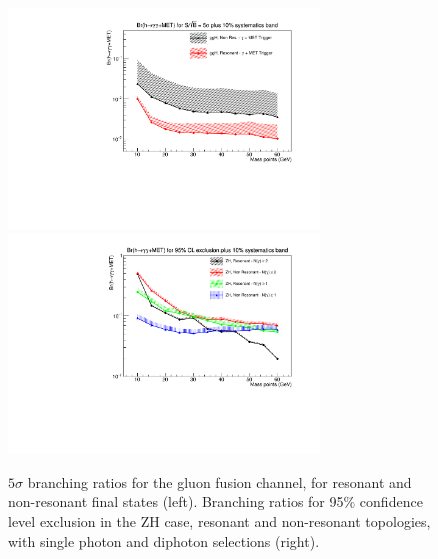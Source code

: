 \documentclass[11pt]{article}
\begin{document}
\begin{figure}[htbp]
\centering
\includegraphics[height=2.3in]{finalresults/branchingratio_ggh.pdf}
\includegraphics[height=2.3in]{finalresults/exclusion_zh.pdf}
\caption{$5\sigma$ branching ratios for the gluon fusion channel, for resonant and non-resonant final states (left). Branching ratios for 95$\%$ confidence level exclusion in the ZH case, resonant and non-resonant topologies, with single photon and diphoton selections (right).}
\label{fig:branching_5sigma}
\end{figure}




\end{document}
